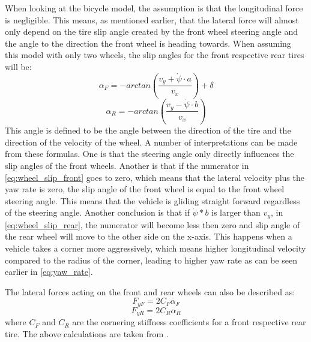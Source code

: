 When looking at the bicycle model, the assumption is that the longitudinal force is negligible. This means, as mentioned earlier, that the lateral force will almost only depend on the tire slip angle created by the front wheel steering angle and the angle to the direction the front wheel is heading towards. When assuming this model with only two wheels, the slip angles for the front respective rear tires will be:
\begin{equation} \label{eq:wheel_slip_front}
	\alpha _{F} = -arctan(\dfrac{v_{y} + \dot \psi  \cdot a}{v_{x}}) + \delta
\end{equation}
\begin{equation} \label{eq:wheel_slip_rear}
\alpha _{R} = -arctan(\dfrac{v_{y} - \dot \psi  \cdot b}{v_{x}})
\end{equation}
This angle is defined to be the angle between the direction of the tire and the direction of the velocity of the wheel. A number of interpretations can be made from these formulas. One is that the steering angle only directly influences the slip angles of the front wheels. Another is that if the numerator in \ref{eq:wheel_slip_front} goes to zero, which means that the lateral velocity plus the yaw rate is zero, the slip angle of the front wheel is equal to the front wheel steering angle. This means that the vehicle is gliding straight forward regardless of the steering angle. Another conclusion is that if $ \dot \psi *b $ is larger than $ v_{y} $, in \ref{eq:wheel_slip_rear}, the numerator will become less then zero and slip angle of the rear wheel will move to the other side on the x-axis. This happens when a vehicle takes a corner more aggressively, which means higher longitudinal velocity compared to the radius of the corner, leading to higher yaw rate as can be seen earlier in \ref{eq:yaw_rate}.

The lateral forces acting on the front and rear wheels can also be described as: 
\begin{equation}
	F_{yF} = 2C_{F}\alpha _{F}
\end{equation}
\begin{equation}
	F_{yR} = 2C_{R}\alpha _{R}
\end{equation}
where $ C_{F} $ and $ C_{R} $ are the cornering stiffness coefficients for a front respective rear tire. The above calculations are taken from \cite{rajamani}. 

